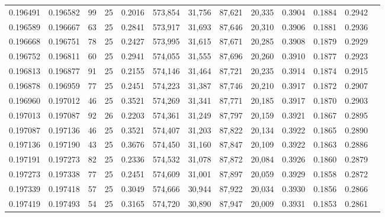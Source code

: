 \begin{tabular}{rrrrrrrrrrrrr}
0.196491 & 0.196582 &  99 &  25 &                                     0.2016 & 573,854 &  31,756 &  87,621 &  20,335 & 0.3904 & 0.1884 & 0.2942 \\
0.196589 & 0.196667 &  63 &  25 &                                     0.2841 & 573,917 &  31,693 &  87,646 &  20,310 & 0.3906 & 0.1881 & 0.2936 \\
0.196668 & 0.196751 &  78 &  25 &                                     0.2427 & 573,995 &  31,615 &  87,671 &  20,285 & 0.3908 & 0.1879 & 0.2929 \\
0.196752 & 0.196811 &  60 &  25 &                                     0.2941 & 574,055 &  31,555 &  87,696 &  20,260 & 0.3910 & 0.1877 & 0.2923 \\
0.196813 & 0.196877 &  91 &  25 &                                     0.2155 & 574,146 &  31,464 &  87,721 &  20,235 & 0.3914 & 0.1874 & 0.2915 \\
0.196878 & 0.196959 &  77 &  25 &                                     0.2451 & 574,223 &  31,387 &  87,746 &  20,210 & 0.3917 & 0.1872 & 0.2907 \\
0.196960 & 0.197012 &  46 &  25 &                                     0.3521 & 574,269 &  31,341 &  87,771 &  20,185 & 0.3917 & 0.1870 & 0.2903 \\
0.197013 & 0.197087 &  92 &  26 &                                     0.2203 & 574,361 &  31,249 &  87,797 &  20,159 & 0.3921 & 0.1867 & 0.2895 \\
0.197087 & 0.197136 &  46 &  25 &                                     0.3521 & 574,407 &  31,203 &  87,822 &  20,134 & 0.3922 & 0.1865 & 0.2890 \\
0.197136 & 0.197190 &  43 &  25 &                                     0.3676 & 574,450 &  31,160 &  87,847 &  20,109 & 0.3922 & 0.1863 & 0.2886 \\
0.197191 & 0.197273 &  82 &  25 &                                     0.2336 & 574,532 &  31,078 &  87,872 &  20,084 & 0.3926 & 0.1860 & 0.2879 \\
0.197273 & 0.197338 &  77 &  25 &                                     0.2451 & 574,609 &  31,001 &  87,897 &  20,059 & 0.3929 & 0.1858 & 0.2872 \\
0.197339 & 0.197418 &  57 &  25 &                                     0.3049 & 574,666 &  30,944 &  87,922 &  20,034 & 0.3930 & 0.1856 & 0.2866 \\
0.197419 & 0.197493 &  54 &  25 &                                     0.3165 & 574,720 &  30,890 &  87,947 &  20,009 & 0.3931 & 0.1853 & 0.2861 \\

\end{tabular}
